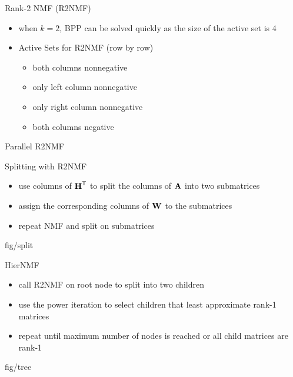 \documentclass{beamer}
\begin{document}
\begin{frame}{Rank-2 NMF (R2NMF)}
    \begin{itemize}
        \item when $k = 2$, BPP can be solved quickly as the size of the active set is 4
        \item Active Sets for R2NMF (row by row)
        \begin{itemize}
            \item both columns nonnegative
            \item only left column nonnegative
            \item only right column nonnegative
            \item both columns negative
        \end{itemize}
    \end{itemize}
\end{frame}

\begin{frame}{Parallel R2NMF}
\end{frame}

\begin{frame}{Splitting with R2NMF}
    \begin{itemize}
        \item use columns of $\M{H}^\Tra$ to split the columns of $\M{A}$ into two submatrices
        \item assign the corresponding columns of $\M{W}$ to the submatrices
        \item repeat NMF and split on submatrices
    \end{itemize}
    \begin{adjustbox}{max totalsize={.7\textwidth}{.6\textheight},center}
        {fig/split}
    \end{adjustbox}
\end{frame}

\begin{frame}{HierNMF}
    \begin{itemize}
        \item call R2NMF on root node to split into two children
        \item use the power iteration to select children that least approximate rank-1 matrices
        \item repeat until maximum number of nodes is reached or all child matrices are rank-1
    \end{itemize}
    \begin{adjustbox}{max totalsize={.7\textwidth}{.6\textheight},center}
        {fig/tree}
    \end{adjustbox}
\end{frame}
\end{document}
